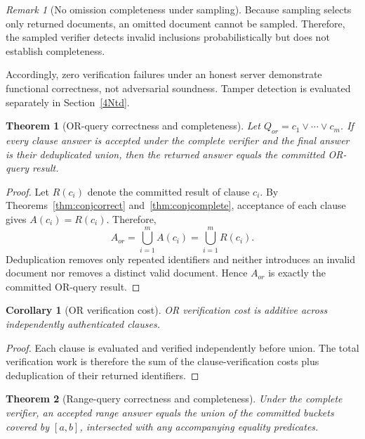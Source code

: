 \documentclass[journal]{IEEEtran}
\theoremstyle{tight}
\newtheorem{corollary}{Corollary}
\newtheorem{theorem}{Theorem}
\theoremstyle{remark}
\newtheorem{remark}{Remark}
\theoremstyle{plain}
\begin{document}
\begin{remark}[No omission completeness under sampling]
\label{rem:omission}
Because sampling selects only returned documents, an omitted document cannot be sampled. Therefore, the sampled verifier detects invalid inclusions probabilistically but does not establish completeness.
\end{remark}

Accordingly, zero verification failures under an honest server demonstrate functional correctness, not adversarial soundness. Tamper detection is evaluated separately in Section~\ref{4Ntd}.

\begin{theorem}[OR-query correctness and completeness]
\label{thm:orcorrect}
Let \(Q_{or}=c_1\lor\cdots\lor c_m\). If every clause answer is accepted under the complete verifier and the final answer is their deduplicated union, then the returned answer equals the committed OR-query result.
\end{theorem}

\begin{proof}
Let \(R(c_i)\) denote the committed result of clause \(c_i\). By Theorems~\ref{thm:conjcorrect} and~\ref{thm:conjcomplete}, acceptance of each clause gives \(A(c_i)=R(c_i)\). Therefore,
\[
A_{or}
=\bigcup_{i=1}^{m}A(c_i)
=\bigcup_{i=1}^{m}R(c_i).
\]
Deduplication removes only repeated identifiers and neither introduces an invalid document nor removes a distinct valid document. Hence \(A_{or}\) is exactly the committed OR-query result.
\end{proof}

\begin{corollary}[OR verification cost]
\label{cor:oradd}
OR verification cost is additive across independently authenticated clauses.
\end{corollary}

\begin{proof}
Each clause is evaluated and verified independently before union. The total verification work is therefore the sum of the clause-verification costs plus deduplication of their returned identifiers.
\end{proof}

\begin{theorem}[Range-query correctness and completeness]
\label{thm:rangecorrect}
Under the complete verifier, an accepted range answer equals the union of the committed buckets covered by \([a,b]\), intersected with any accompanying equality predicates.
\end{theorem}
\end{document}
